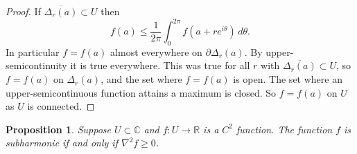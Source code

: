 \documentclass[12pt,openany]{book}
\newcommand{\C}{{\mathbb{C}}}
\newcommand{\R}{{\mathbb{R}}}
\theoremstyle{plain}
\newtheorem{prop}[thm]{Proposition}
\theoremstyle{remark}
\theoremstyle{definition}
\theoremstyle{exercise}
\theoremstyle{example}
\begin{document}
\begin{proof}
If
$\overline{\Delta_r(a)} \subset U$ then
\begin{equation*}
f(a) \leq \frac{1}{2\pi} \int_0^{2\pi} f(a+re^{i\theta})\, d\theta .
\end{equation*}
In particular $f = f(a)$ almost everywhere on $\partial \Delta_r(a)$.
By upper-semicontinuity it is true everywhere.  This was true for all $r$
with $\overline{\Delta_r(a)} \subset U$, so $f=f(a)$ on $\Delta_r(a)$,
and the set where $f=f(a)$ is open.  The set where an upper-semicontinuous
function attains a maximum is closed.  So $f=f(a)$ on $U$ as $U$ is
connected.
\end{proof}



\begin{prop}
Suppose $U \subset \C$ and $f \colon U \to \R$ is a $C^2$ function.
The function $f$ is subharmonic if and only if
$\nabla^2 f \geq 0$.
\end{prop}
\end{document}
